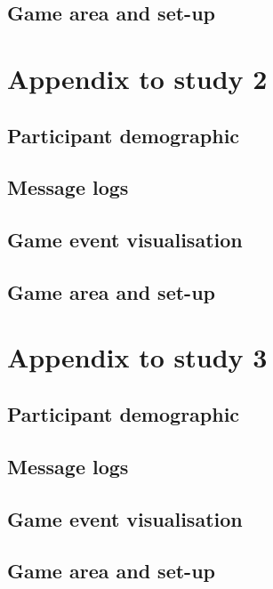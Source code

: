 \section{Game area and set-up}

\chapter{Appendix to study 2}

\section{Participant demographic}

\section{Message logs}

\section{Game event visualisation}

\section{Game area and set-up}

\chapter{Appendix to study 3}

\section{Participant demographic}

\section{Message logs}

\section{Game event visualisation}

\section{Game area and set-up}
